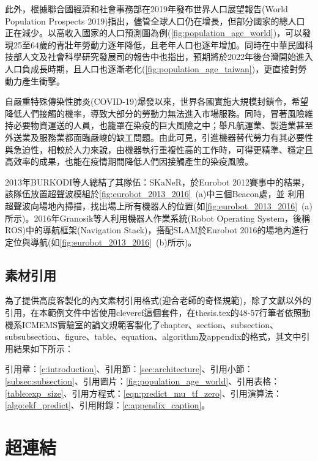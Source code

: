此外，根據聯合國經濟和社會事務部在2019年發布世界人口展望報告(World Population Prospects 2019)\cite{nations2019world}指出，儘管全球人口仍在增長，但部分國家的總人口正在減少。以高收入國家的人口預測圖為例(\cref{fig:population_age_world})，可以發現25至64歲的青壯年勞動力逐年降低，且老年人口也逐年增加。同時在中華民國科技部人文及社會科學研究發展司的報告中也指出\cite{人文與社科簡訊_人口老化}，預期將於2022年後台灣開始進入人口負成長時期，且人口也逐漸老化(\cref{fig:population_age_taiwan})，更直接對勞動力產生衝擊。

自嚴重特殊傳染性肺炎(COVID-19)爆發以來，世界各國實施大規模封鎖令，希望降低人們接觸的機率，導致大部分的勞動力無法進入市場服務。同時，冒著風險維持必要物資運送的人員，也籠罩在染疫的巨大風險之中；舉凡航運業、製造業甚至外送業及服務業都面臨嚴峻的缺工問題。由此可見，引進機器替代勞力有其必要性與急迫性，相較於人力來說，由機器執行重複性高的工作時，可得更精準、穩定且高效率的成果，也能在疫情期間降低人們因接觸產生的染疫風險。

2013年BURKODI等人\cite{eurobot_ultrasound_2013}總結了其隊伍：SKaNeR，於Eurobot 2012賽事中的結果，該隊伍放置超聲波模組於\cref{fig:eurobot_2013_2016}~(a)中三個Beacon處，並
利用超聲波向場地內掃描，找出場上所有機器人的位置(如\cref{fig:eurobot_2013_2016}~(a)所示)。2016年Granosik等人\cite{eurobot_ros_2016}利用機器人作業系統(Robot Operating System，後稱ROS)\cite{ros_2009}中的導航框架(Navigation Stack)，搭配SLAM於Eurobot 2016的場地內進行定位與導航(如\cref{fig:eurobot_2013_2016}~(b)所示)。


\subsection{素材引用}

為了提供高度客製化的內文素材引用格式(迎合老師的奇怪規範)，除了文獻以外的引用，在本範例文件中皆使用cleveref這個套件，在thesis.tex的48-57行筆者依照動機系ICMEMS實驗室的論文規範客製化了chapter、section、subsection、subsubsection、figure、table、equation、algorithm及appendix的格式，其文中引用結果如下所示：

引用章：\cref{c:introduction}、引用節：\cref{sec:architecture}、引用小節：\cref{subsec:subsection}、引用圖片：\cref{fig:population_age_world}、引用表格：\cref{table:exp_size}、引用方程式：\cref{eqn:predict_mu_tf_zero}、引用演算法：\cref{algo:ekf_predict}、引用附錄：\cref{c:appendix_caption}。

\section{超連結}

